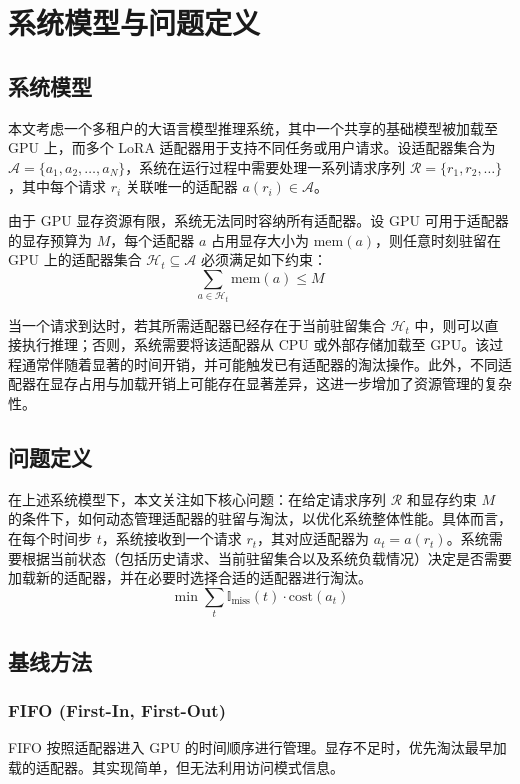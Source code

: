 \section{系统模型与问题定义}
\subsection{系统模型}
本文考虑一个多租户的大语言模型推理系统，其中一个共享的基础模型被加载至 GPU 上，而多个 LoRA 适配器用于支持不同任务或用户请求。设适配器集合为 $\mathcal{A}=\{a_1,a_2,\dots,a_N\}$，系统在运行过程中需要处理一系列请求序列 $\mathcal{R}=\{r_1,r_2,\dots\}$，其中每个请求 $r_i$ 关联唯一的适配器 $a(r_i)\in\mathcal{A}$。

由于 GPU 显存资源有限，系统无法同时容纳所有适配器。设 GPU 可用于适配器的显存预算为 $M$，每个适配器 $a$ 占用显存大小为 $\mathrm{mem}(a)$，则任意时刻驻留在 GPU 上的适配器集合 $\mathcal{H}_t\subseteq\mathcal{A}$ 必须满足如下约束：
\begin{equation}
\sum_{a\in\mathcal{H}_t}\mathrm{mem}(a)\le M
\end{equation}

当一个请求到达时，若其所需适配器已经存在于当前驻留集合 $\mathcal{H}_t$ 中，则可以直接执行推理；否则，系统需要将该适配器从 CPU 或外部存储加载至 GPU。该过程通常伴随着显著的时间开销，并可能触发已有适配器的淘汰操作。此外，不同适配器在显存占用与加载开销上可能存在显著差异，这进一步增加了资源管理的复杂性。

\subsection{问题定义}
在上述系统模型下，本文关注如下核心问题：在给定请求序列 $\mathcal{R}$ 和显存约束 $M$ 的条件下，如何动态管理适配器的驻留与淘汰，以优化系统整体性能。具体而言，在每个时间步 $t$，系统接收到一个请求 $r_t$，其对应适配器为 $a_t=a(r_t)$。系统需要根据当前状态（包括历史请求、当前驻留集合以及系统负载情况）决定是否需要加载新的适配器，并在必要时选择合适的适配器进行淘汰。
\begin{equation}
\min\sum_t\mathbb{I}_{\text{miss}}(t)\cdot\mathrm{cost}(a_t)
\end{equation}

\subsection{基线方法}
\subsubsection{FIFO (First-In, First-Out)}
FIFO 按照适配器进入 GPU 的时间顺序进行管理。显存不足时，优先淘汰最早加载的适配器。其实现简单，但无法利用访问模式信息。

